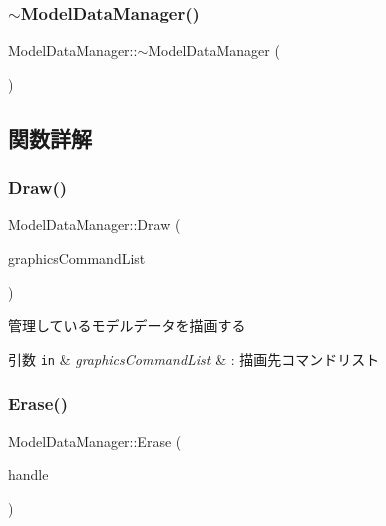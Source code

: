 \subsubsection{\texorpdfstring{$\sim$\+Model\+Data\+Manager()}{~ModelDataManager()}}
{\footnotesize\ttfamily Model\+Data\+Manager\+::$\sim$\+Model\+Data\+Manager (\begin{DoxyParamCaption}{ }\end{DoxyParamCaption})}



\subsection{関数詳解}
\mbox{\label{class_model_data_manager_a9c2d9c3a70323f7d486fb42de162d303}} 
\subsubsection{\texorpdfstring{Draw()}{Draw()}}
{\footnotesize\ttfamily Model\+Data\+Manager\+::\+Draw (\begin{DoxyParamCaption}\item[{Com\+Ptr$<$ I\+D3\+D12\+Graphics\+Command\+List $>$}]{graphics\+Command\+List }\end{DoxyParamCaption})}

管理しているモデルデータを描画する 
\begin{DoxyParams}[1]{引数}
\mbox{\tt in}  & {\em graphics\+Command\+List} & \+: 描画先コマンドリスト \\
\hline
\end{DoxyParams}
\mbox{\label{class_model_data_manager_aaa1dc0669900e8dc8186ae075133ba24}} 
\subsubsection{\texorpdfstring{Erase()}{Erase()}}
{\footnotesize\ttfamily Model\+Data\+Manager\+::\+Erase (\begin{DoxyParamCaption}\item[{int}]{handle }\end{DoxyParamCaption})}

